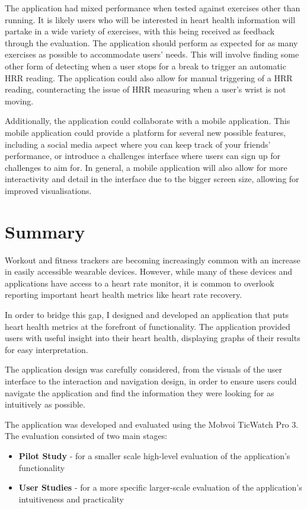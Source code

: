 \documentclass{l4proj}
\begin{document}
The application had mixed performance when tested against exercises other than running. It is likely users who will be interested in heart health information will partake in a wide variety of exercises, with this being received as feedback through the evaluation. The application should perform as expected for as many exercises as possible to accommodate users' needs. This will involve finding some other form of detecting when a user stops for a break to trigger an automatic HRR reading. The application could also allow for manual triggering of a HRR reading, counteracting the issue of HRR measuring when a user’s wrist is not moving.

Additionally, the application could collaborate with a mobile application. This mobile application could provide a platform for several new possible features, including a social media aspect where you can keep track of your friends’ performance, or introduce a challenges interface where users can sign up for challenges to aim for. In general, a mobile application will also allow for more interactivity and detail in the interface due to the bigger screen size, allowing for improved visualisations.

\section{Summary}
\label{sec:summary}

Workout and fitness trackers are becoming increasingly common with an increase in easily accessible wearable devices. However, while many of these devices and applications have access to a heart rate monitor, it is common to overlook reporting important heart health metrics like heart rate recovery.

In order to bridge this gap, I designed and developed an application that puts heart health metrics at the forefront of functionality. The application provided users with useful insight into their heart health, displaying graphs of their results for easy interpretation.

The application design was carefully considered, from the visuals of the user interface to the interaction and navigation design, in order to ensure users could navigate the application and find the information they were looking for as intuitively as possible.

The application was developed and evaluated using the Mobvoi TicWatch Pro 3. The evaluation consisted of two main stages:

\begin{itemize}
    \item \textbf{Pilot Study} - for a smaller scale high-level evaluation of the application’s functionality
    \item \textbf{User Studies} - for a more specific larger-scale evaluation of the application’s intuitiveness and practicality
\end{itemize}
\end{document}
